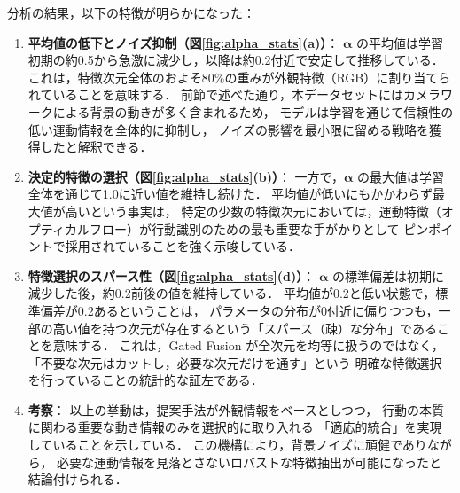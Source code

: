 分析の結果，以下の特徴が明らかになった：
\begin{enumerate}
  \item \textbf{平均値の低下とノイズ抑制（図\ref{fig:alpha_stats}(a)）}：
    $\boldsymbol{\alpha}$ の平均値は学習初期の約0.5から急激に減少し，以降は約0.2付近で安定して推移している．
    これは，特徴次元全体のおよそ80\%の重みが外観特徴（RGB）に割り当てられていることを意味する．
    前節で述べた通り，本データセットにはカメラワークによる背景の動きが多く含まれるため，
    モデルは学習を通じて信頼性の低い運動情報を全体的に抑制し，
    ノイズの影響を最小限に留める戦略を獲得したと解釈できる．

  \item \textbf{決定的特徴の選択（図\ref{fig:alpha_stats}(b)）}：
    一方で，$\boldsymbol{\alpha}$ の最大値は学習全体を通じて1.0に近い値を維持し続けた．
    平均値が低いにもかかわらず最大値が高いという事実は，
    特定の少数の特徴次元においては，運動特徴（オプティカルフロー）が行動識別のための最も重要な手がかりとして
    ピンポイントで採用されていることを強く示唆している．

  \item \textbf{特徴選択のスパース性（図\ref{fig:alpha_stats}(d)）}：
    $\boldsymbol{\alpha}$ の標準偏差は初期に減少した後，約0.2前後の値を維持している．
    平均値が0.2と低い状態で，標準偏差が0.2あるということは，
    パラメータの分布が0付近に偏りつつも，一部の高い値を持つ次元が存在するという「スパース（疎）な分布」であることを意味する．
    これは，Gated Fusion が全次元を均等に扱うのではなく，
    「不要な次元はカットし，必要な次元だけを通す」という
    明確な特徴選択を行っていることの統計的な証左である．
    
  \item \textbf{考察}：
    以上の挙動は，提案手法が外観情報をベースとしつつ，
    行動の本質に関わる重要な動き情報のみを選択的に取り入れる
    「適応的統合」を実現していることを示している．
    この機構により，背景ノイズに頑健でありながら，
    必要な運動情報を見落とさないロバストな特徴抽出が可能になったと結論付けられる．
\end{enumerate}
